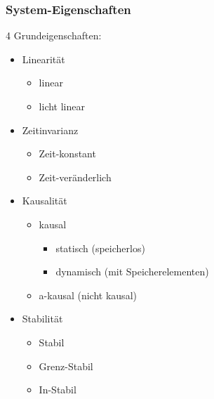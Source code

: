 \documentclass{article}
\begin{document}
\subsubsection*{\centering System-Eigenschaften}
4 Grundeigenschaften:
\begin{itemize}
    \item Linearität
    \begin{itemize}
        \item linear
        \item licht linear
    \end{itemize}
    
    \item Zeitinvarianz
    \begin{itemize}
        \item Zeit-konstant
        \item Zeit-veränderlich
    \end{itemize}
    
    \item Kausalität
    \begin{itemize}
        \item kausal
        \begin{itemize}
            \item statisch (speicherlos)
            \item dynamisch (mit Speicherelementen)
        \end{itemize}
        \item a-kausal (nicht kausal)
    \end{itemize}
    
    \item Stabilität
    \begin{itemize}
        \item Stabil
        \item Grenz-Stabil
        \item In-Stabil
    \end{itemize}
\end{itemize}
\end{document}
